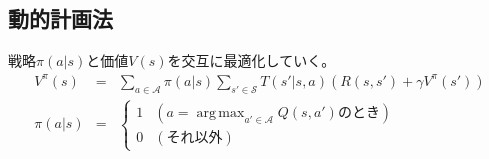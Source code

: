 \documentclass[dvipdfmx]{jsarticle}
\DeclareMathOperator*{\argmax}{arg\,max}
\begin{document}
\subsection{動的計画法}
戦略$\pi(a | s)$と価値$V(s)$を交互に最適化していく。
\begin{eqnarray}
	V^\pi(s) &=& \sum_{a \in \mathcal{A}} \pi(a | s) \sum_{s' \in \mathcal{S}} T(s' | s, a) \left( R(s, s') + \gamma V^\pi(s') \right) \\
	\pi(a | s) &=& \left\{ \begin{array}{ll} 1 & (a = \argmax_{a' \in \mathcal{A}} Q(s, a')のとき) \\ 0 & (それ以外) \end{array} \right.
\end{eqnarray}
\end{document}
